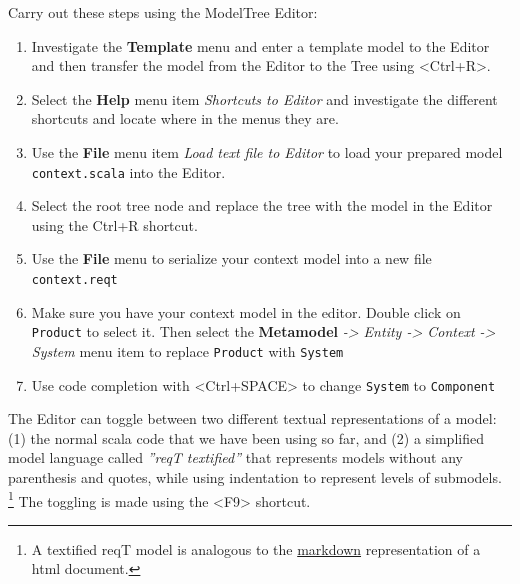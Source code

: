 \documentclass[11pt]{article}
\begin{document}
\begin{framed}
Carry out these steps using the ModelTree Editor:
\begin{enumerate}
\item Investigate the {\bf Template} menu and enter a template model to the Editor and then transfer the model from the Editor to the Tree using <Ctrl+R>.
\item Select the {\bf Help} menu item {\it Shortcuts to Editor} and investigate the different shortcuts and locate where in the menus they are. 
\item Use the {\bf File} menu item {\it Load text file to Editor} to load your prepared model \verb+context.scala+ into the Editor.
\item Select the root tree node and replace the tree with the model in the Editor using the Ctrl+R shortcut.
\item Use the {\bf File} menu to serialize your context model into a new file \verb+context.reqt+
\item Make sure you have your context model in the editor. Double click on \verb+Product+ to select it. Then select the {\bf Metamodel} {\it -> Entity -> Context -> System} menu item to replace \verb+Product+ with \verb+System+
\item Use code completion with <Ctrl+SPACE> to change \verb+System+ to \verb+Component+ 
\end{enumerate}
\end{framed}

The Editor can toggle between two different textual representations of a model: (1) the normal scala code that we have been using so far, and (2) a simplified model language called {\it ''reqT textified''} that represents models without any parenthesis and quotes, while using indentation to represent levels of submodels. \footnote{A textified reqT model is analogous to the \href{http://en.wikipedia.org/wiki/Markdown}{markdown} representation of a html document.} The toggling is made using the <F9> shortcut.
\end{document}
